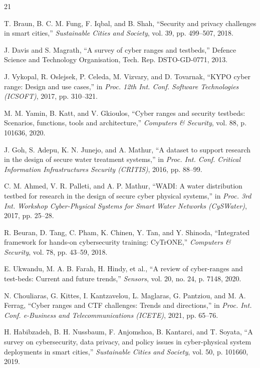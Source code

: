 \documentclass[conference,10pt]{IEEEtran}
\begin{document}
\begin{thebibliography}{21}

T. Braun, B. C. M. Fung, F. Iqbal, and B. Shah, ``Security and privacy challenges in smart cities,'' \textit{Sustainable Cities and Society}, vol. 39, pp. 499--507, 2018.

J. Davis and S. Magrath, ``A survey of cyber ranges and testbeds,'' Defence Science and Technology Organisation, Tech. Rep. DSTO-GD-0771, 2013.

J. Vykopal, R. Oslejsek, P. Celeda, M. Vizvary, and D. Tovarnak, ``KYPO cyber range: Design and use cases,'' in \textit{Proc. 12th Int. Conf. Software Technologies (ICSOFT)}, 2017, pp. 310--321.

M. M. Yamin, B. Katt, and V. Gkioulos, ``Cyber ranges and security testbeds: Scenarios, functions, tools and architecture,'' \textit{Computers \& Security}, vol. 88, p. 101636, 2020.

J. Goh, S. Adepu, K. N. Junejo, and A. Mathur, ``A dataset to support research in the design of secure water treatment systems,'' in \textit{Proc. Int. Conf. Critical Information Infrastructures Security (CRITIS)}, 2016, pp. 88--99.

C. M. Ahmed, V. R. Palleti, and A. P. Mathur, ``WADI: A water distribution testbed for research in the design of secure cyber physical systems,'' in \textit{Proc. 3rd Int. Workshop Cyber-Physical Systems for Smart Water Networks (CySWater)}, 2017, pp. 25--28.

R. Beuran, D. Tang, C. Pham, K. Chinen, Y. Tan, and Y. Shinoda, ``Integrated framework for hands-on cybersecurity training: CyTrONE,'' \textit{Computers \& Security}, vol. 78, pp. 43--59, 2018.

E. Ukwandu, M. A. B. Farah, H. Hindy, et al., ``A review of cyber-ranges and test-beds: Current and future trends,'' \textit{Sensors}, vol. 20, no. 24, p. 7148, 2020.

N. Chouliaras, G. Kittes, I. Kantzavelou, L. Maglaras, G. Pantziou, and M. A. Ferrag, ``Cyber ranges and CTF challenges: Trends and directions,'' in \textit{Proc. Int. Conf. e-Business and Telecommunications (ICETE)}, 2021, pp. 65--76.

H. Habibzadeh, B. H. Nussbaum, F. Anjomshoa, B. Kantarci, and T. Soyata, ``A survey on cybersecurity, data privacy, and policy issues in cyber-physical system deployments in smart cities,'' \textit{Sustainable Cities and Society}, vol. 50, p. 101660, 2019.


\end{thebibliography}
\end{document}
